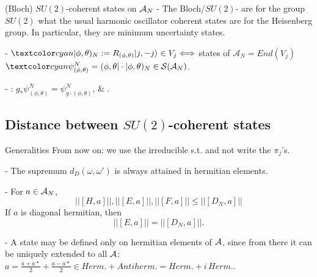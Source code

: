 \begin{frame}{(Bloch) $SU(2)$-coherent states on $\mathcal A_N$} %
- The Bloch/$SU(2)$- are for the group $SU(2)$ what the usual harmonic oscillator coherent states are for the Heisenberg group. In particular, they are minimum uncertainty states. 


-  $\lbtext{|\phi, \theta)_N} := R_{(\phi, \theta)}|j, -j\rangle \in V_j \Longleftrightarrow $ states of $\mathcal A_N = End(V_j)$ $\lbtext{\psi^N_{(\phi, \theta)}} = (\phi, \theta| \cdot |\phi, \theta)_N \in \mathcal S(\mathcal A_N)$. 

- : $g_* \psi^N_{(\phi, \theta)} = \psi^N_{g\cdot (\phi, \theta)}$, \& .

\end{frame}

\subsection{Distance between $SU(2)$-coherent states}

\begin{frame}{Generalities} %
From now on: we use the irreducible s.t. and not write the $\pi_j$'s.

- The supremum $d_D(\omega, \omega')$ is always attained in hermitian elements.

- For $a \in \mathcal A_N$, 
\begin{equation} \label{ineqDN}
    ||[H, a]||, ||[E, a]||, ||[F, a]||  \leq ||[D_N, a]||
\end{equation} \label{eqDNdiag}
If $a$ is diagonal hermitian, then
\begin{equation}
    ||[E, a]|| = ||[D_N, a]||.
\end{equation}

- A state may be defined only on hermitian elements of $\mathcal A$, since from there it can be uniquely extended to all $\mathcal A$: $a = \frac{a+a*}{2} + \frac{a - a*}{2} \in Herm. + Antiherm. = Herm. + i\, Herm.$.

\end{frame}

